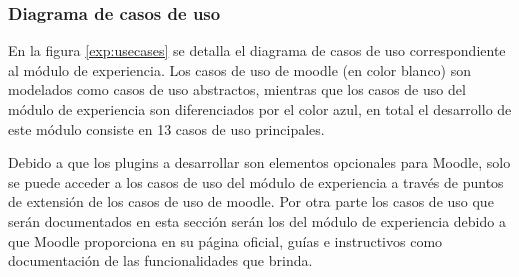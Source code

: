 \subsubsection*{Diagrama de casos de uso}

 En la figura \ref{exp:usecases} se detalla el diagrama de casos de uso correspondiente al módulo
 de experiencia. Los casos de uso de moodle (en color blanco) son modelados como casos de uso
 abstractos, mientras que los casos de uso del módulo de experiencia son diferenciados por el
 color azul, en total el desarrollo de este módulo consiste en 13 casos de uso principales.


 \noindent
 Debido a que los plugins a desarrollar son elementos opcionales para Moodle, solo se puede
 acceder a los casos de uso del módulo de experiencia a través de puntos de extensión de los
 casos de uso de moodle. Por otra parte los casos de uso que serán documentados en esta sección
 serán los del módulo de experiencia debido a que Moodle proporciona en su página oficial, guías
 e instructivos como documentación de las funcionalidades que brinda.



